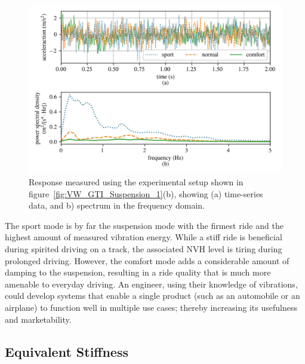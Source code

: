 \documentclass[12pt,letter]{article}
\begin{document}
\begin{vibration_case_study}
			\begin{figure}[H]
				\centering
				\includegraphics[width=6in]{../figures/VW_GTI_Suspension_2}
				\vspace{-1.5ex}
				\caption{Response measured using the experimental setup shown in figure~\ref{fig:VW_GTI_Suspension_1}(b), showing (a) time-series data, and b) spectrum in the frequency domain.}
				\label{fig:VW_GTI_Suspension_2}
			\end{figure}
			The sport mode is by far the suspension mode with the firmest ride and the highest amount of measured vibration energy. While a stiff ride is beneficial during spirited driving on a track, the associated NVH level is tiring during prolonged driving. However, the comfort mode adds a considerable amount of damping to the suspension, resulting in a ride quality that is much more amenable to everyday driving. An engineer, using their knowledge of vibrations, could develop systems that enable a single product (such as an automobile or an airplane) to function well in multiple use cases; thereby increasing its usefulness and marketability. 
		\end{vibration_case_study}
	
	\pagebreak	
	\subsection{Equivalent Stiffness}
		
\end{document}
